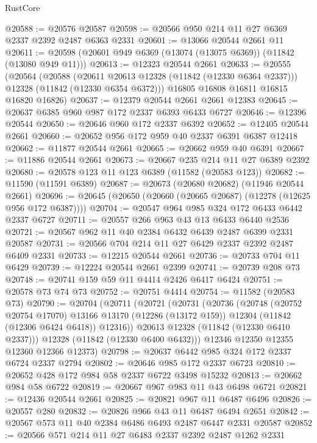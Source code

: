 \begin{lexlean}{RustCore}
\begin{coremodule}
@20588 := @20576 @20587
@20598 := @20566 @950 @214 @11 @27 @6369 @2337 @2392 @2487 @6363 @2331
@20601 := @13066 @20544 @2661 @11
@20611 := @20598 (@20601 @949 @6369 (@13074 (@13075 @6369)) (@11842 (@13080 @949 @11)))
@20613 := @12323 @20544 @2661
@20633 := @20555
    (@20564
      (@20588
        (@20611 @20613 @12328 (@11842 (@12330 @6364 @2337)))
        @12328
        (@11842 (@12330 @6354 @6372)))
      @16805
      @16808
      @16811
      @16815
      @16820
      @16826)
@20637 := @12379 @20544 @2661 @2661 @12383
@20645 := @20637 @6385 @960 @987 @172 @2337 @6393 @6433 @6727
@20646 := @12396 @20544
@20650 := @20646 @960 @172 @2337 @6392
@20652 := @12405 @20544 @2661
@20660 := @20652 @956 @172 @959 @40 @2337 @6391 @6387 @12418
@20662 := @11877 @20544 @2661
@20665 := @20662 @959 @40 @6391
@20667 := @11886 @20544 @2661
@20673 := @20667 @235 @214 @11 @27 @6389 @2392
@20680 := @20578 @123 @11 @123 @6389 (@11582 (@20583 @123))
@20682 := @11590 (@11591 @6389)
@20687 := @20673 (@20680 @20682) (@11946 @20544 @2661)
@20696 := @20645 (@20650 (@20660 (@20665 @20687) (@12278 (@12625 @956 @172 @6387))))
@20704 := @20547 @964 @985 @324 @172 @6433 @6442 @2337 @6727
@20711 := @20557 @266 @963 @43 @13 @6433 @6440 @2536
@20721 := @20567 @962 @11 @40 @2384 @6432 @6439 @2487 @6399 @2331 @20587
@20731 := @20566 @704 @214 @11 @27 @6429 @2337 @2392 @2487 @6409 @2331
@20733 := @12215 @20544 @2661
@20736 := @20733 @704 @11 @6429
@20739 := @12224 @20544 @2661 @2399
@20741 := @20739 @208 @73
@20748 := @20741 @159 @59 @11 @4414 @2426 @6417 @6424
@20751 := @20578 @73 @74 @73
@20752 := @20751 @4414
@20754 := @11582 (@20583 @73)
@20790 := @20704
    (@20711
      (@20721
        (@20731
          (@20736
            (@20748
              (@20752 @20754 @17070)
              @13166
              @13170
              (@12286 (@13172 @159))
              @12304
              (@11842 (@12306 @6424 @6418))
              @12316))
          @20613
          @12328
          (@11842 (@12330 @6410 @2337)))
        @12328
        (@11842 (@12330 @6400 @6432)))
      @12346
      @12350
      @12355
      @12360
      @12366
      @12373)
@20798 := @20637 @6442 @985 @324 @172 @2337 @6724 @2337 @2794
@20802 := @20646 @985 @172 @2337 @6723
@20810 := @20652 @428 @172 @984 @58 @2337 @6722 @3498 @15232
@20813 := @20662 @984 @58 @6722
@20819 := @20667 @967 @983 @11 @43 @6498 @6721
@20821 := @12436 @20544 @2661
@20825 := @20821 @967 @11 @6487 @6496
@20826 := @20557 @280
@20832 := @20826 @966 @43 @11 @6487 @6494 @2651
@20842 := @20567 @573 @11 @40 @2384 @6486 @6493 @2487 @6447 @2331 @20587
@20852 := @20566 @571 @214 @11 @27 @6483 @2337 @2392 @2487 @1262 @2331

\end{coremodule}
\end{lexlean}
